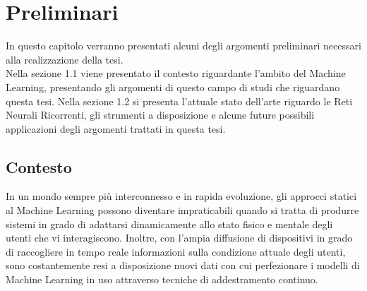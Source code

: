 \chapter{Preliminari}
In questo capitolo verranno presentati alcuni degli argomenti preliminari necessari alla realizzazione della tesi.\\
Nella sezione 1.1 viene presentato il contesto riguardante l'ambito del Machine Learning, presentando gli argomenti di questo campo di studi che riguardano questa tesi. Nella sezione 1.2 si presenta l'attuale stato dell'arte riguardo le Reti Neurali Ricorrenti, gli strumenti a disposizione e alcune future possibili applicazioni degli argomenti trattati in questa tesi.

\section{Contesto}
In un mondo sempre più interconnesso e in rapida evoluzione, gli approcci statici al Machine Learning possono diventare impraticabili quando si tratta di produrre sistemi in grado di adattarsi dinamicamente allo stato fisico e mentale degli utenti che vi interagiscono. Inoltre, con l'ampia diffusione di dispositivi in grado di raccogliere in tempo reale informazioni sulla condizione attuale degli utenti, sono costantemente resi a disposizione nuovi dati con cui perfezionare i modelli di Machine Learning in uso attraverso tecniche di addestramento continuo.

